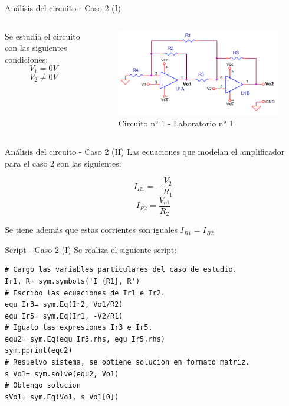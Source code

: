 \documentclass[14pt, aspectratio= 169]{beamer}
\begin{document}
\begin{frame}{Análisis del circuito - Caso 2 (I)}
    \begin{columns}
         Se estudia el circuito con las siguientes condiciones:
        $$ V_{1}= 0V $$ $$ V_{2}\neq0V $$
        \begin{figure}
            \centering
            \includegraphics[width=1.0\linewidth]{img/Circuito 1.png}
            \caption{Circuito n° 1 - Laboratorio n° 1}
            \label{fig:enter-label}
        \end{figure}
    \end{columns}
\end{frame}

\begin{frame}{Análisis del circuito - Caso 2 (II)}
Las ecuaciones que modelan el amplificador para el caso 2 son las siguientes:

$$I_{R1} = - \frac{V_{2}}{R_{1}}$$ 
$$I_{R2} = \frac{V_{o1}}{R_{2}}$$

Se tiene además que estas corrientes son iguales $I_{R1}=I_{R2}$
\end{frame}

\begin{frame}[fragile]{Script - Caso 2 (I)}
Se realiza el siguiente script:
\begin{lstlisting}[style=python]
# Cargo las variables particulares del caso de estudio.
Ir1, R= sym.symbols('I_{R1}, R')
# Escribo las ecuaciones de Ir1 e Ir2.
equ_Ir3= sym.Eq(Ir2, Vo1/R2)
equ_Ir5= sym.Eq(Ir1, -V2/R1)
# Igualo las expresiones Ir3 e Ir5.
equ2= sym.Eq(equ_Ir3.rhs, equ_Ir5.rhs)
sym.pprint(equ2)
# Resuelvo sistema, se obtiene solucion en formato matriz.
s_Vo1= sym.solve(equ2, Vo1)
# Obtengo solucion
sVo1= sym.Eq(Vo1, s_Vo1[0])
\end{lstlisting}
\end{frame}
\end{document}
